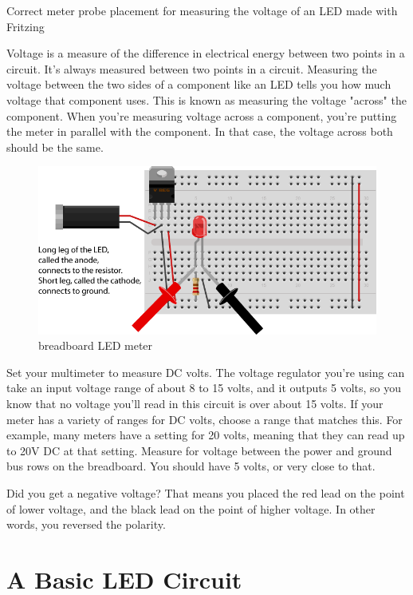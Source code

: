 Correct meter probe placement for measuring the voltage of an LED
made with Fritzing

Voltage is a measure of the difference in electrical energy between two points in a circuit. It's always measured between two points in a circuit. Measuring the voltage between the two sides of a component like an LED tells you how much voltage that component uses. This is known as measuring the voltage "across" the component. When you're measuring voltage across a component, you're putting the meter in parallel with the component. In that case, the voltage across both should be the same.

\begin{figure}[!htb]
 \centering
 \includegraphics[scale=0.8]{img/electronics/breadboard_LED_meter.png}
 \caption{breadboard LED meter}
 \label{breadboard LED meter}
\end{figure}

Set your multimeter to measure DC volts. The voltage regulator you're using can take an input voltage range of about 8 to 15 volts, and it outputs 5 volts, so you know that no voltage you'll read in this circuit is over about 15 volts. If your meter has a variety of ranges for DC volts, choose a range that matches this. For example, many meters have a setting for 20 volts, meaning that they can read up to 20V DC at that setting. Measure for voltage between the power and ground bus rows on the breadboard. You should have 5 volts, or very close to that.

Did you get a negative voltage? That means you placed the red lead on the point of lower voltage, and the black lead on the point of higher voltage. In other words, you reversed the polarity.

\section{A Basic LED Circuit}

